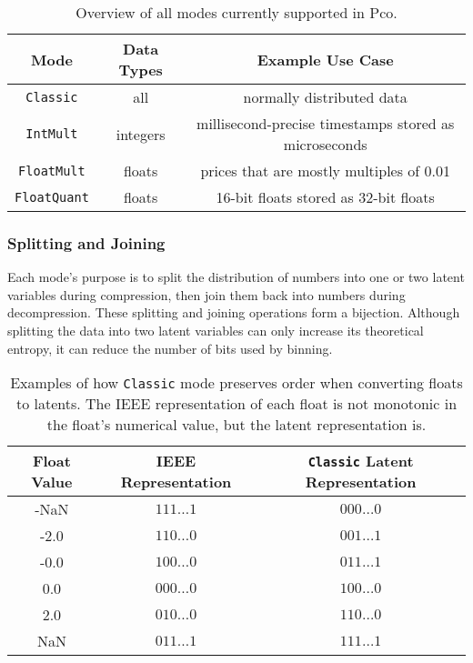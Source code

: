 \documentclass[letterpaper]{article}
\begin{document}
\begin{table}
\begin{center}
\begin{tabular}{ccc}
\toprule
Mode & Data Types & Example Use Case \\
\midrule
\texttt{Classic} & all & normally distributed data \\
\texttt{IntMult} & integers & millisecond-precise timestamps stored as microseconds \\
\texttt{FloatMult} & floats & prices that are mostly multiples of 0.01 \\
\texttt{FloatQuant} & floats & 16-bit floats stored as 32-bit floats \\
\bottomrule
\end{tabular}
\end{center}
\caption{Overview of all modes currently supported in Pco.}
\label{tab:modes}
\end{table}

\subsubsection{Splitting and Joining}

Each mode's purpose is to split the distribution of numbers into one or two latent variables during compression, then join them back into numbers during decompression.
These splitting and joining operations form a bijection.
Although splitting the data into two latent variables can only increase its theoretical entropy, it can reduce the number of bits used by binning.

\begin{table}
\begin{center}
\begin{tabular}{ccc}
\toprule
Float Value & IEEE Representation & \texttt{Classic} Latent Representation \\
\midrule
-NaN & $111\ldots 1$ & $000\ldots 0$ \\
-2.0 & $110\ldots 0$ & $001\ldots 1$ \\
-0.0 & $100\ldots 0$ & $011\ldots 1$ \\
0.0  & $000\ldots 0$ & $100\ldots 0$ \\
2.0  & $010\ldots 0$ & $110\ldots 0$ \\
NaN  & $011\ldots 1$ & $111\ldots 1$ \\
\bottomrule
\end{tabular}
\end{center}
\caption{Examples of how \texttt{Classic} mode preserves order when converting floats to latents.
The IEEE representation of each float is not monotonic in the float's numerical value, but the latent representation is.}
\label{tab:classic_float_examples}
\end{table}
\end{document}
